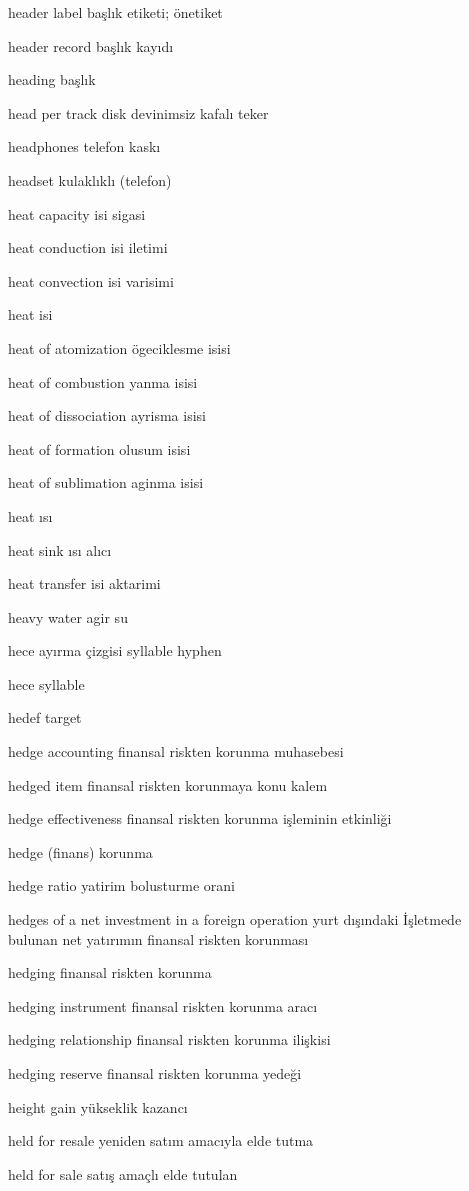 \documentclass[12pt,fleqn]{article}\usepackage{../../common}
\begin{document}
header label başlık etiketi; önetiket

header record başlık kayıdı

heading başlık

head per track disk devinimsiz kafalı teker

headphones telefon kaskı

headset kulaklıklı (telefon)

heat capacity isi sigasi

heat conduction isi iletimi

heat convection isi varisimi

heat isi

heat of atomization ögeciklesme isisi

heat of combustion yanma isisi

heat of dissociation ayrisma isisi

heat of formation olusum isisi

heat of sublimation aginma isisi

heat ısı

heat sink ısı alıcı

heat transfer isi aktarimi

heavy water agir su

hece ayırma çizgisi syllable hyphen

hece syllable

hedef target

hedge accounting finansal riskten korunma muhasebesi

hedged item finansal riskten korunmaya konu kalem

hedge effectiveness finansal riskten korunma işleminin etkinliği

hedge (finans) korunma

hedge ratio yatirim bolusturme orani

hedges of a net investment in a foreign operation yurt dışındaki İşletmede bulunan net yatırımın finansal riskten korunması

hedging finansal riskten korunma

hedging instrument finansal riskten korunma aracı

hedging relationship finansal riskten korunma ilişkisi

hedging reserve finansal riskten korunma yedeği

height gain yükseklik kazancı

held for resale yeniden satım amacıyla elde tutma

held for sale satış amaçlı elde tutulan
\end{document}
